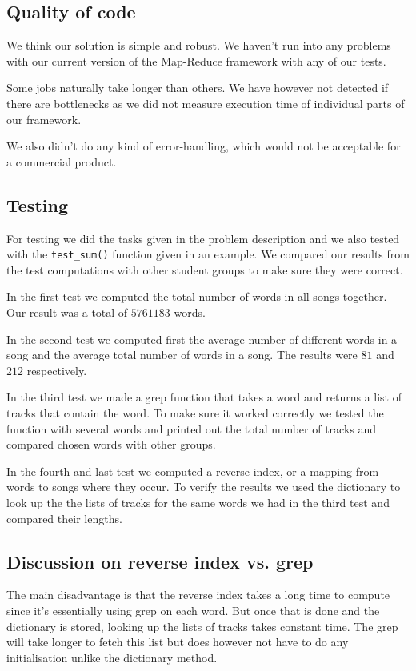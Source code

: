 \documentclass[a4paper,10pt]{article}
\begin{document}
\subsection{Quality of code}
We think our solution is simple and robust. We haven't run into any problems with our current version of the Map-Reduce framework with any of our tests. 

Some jobs naturally take longer than others. We have however not detected if there are bottlenecks as we did not measure execution time of individual parts of our framework.

We also didn't do any kind of error-handling, which would not be acceptable for a commercial product.

\subsection{Testing}

For testing we did the tasks given in the problem description and we also tested with the \verb=test_sum()= function given in an example. We compared our results from the test computations with other student groups to make sure they were correct.

In the first test we computed the total number of words in all songs together. Our result was a total of $5761183$ words.

In the second test we computed first the average number of different words in a song and the average total number of words in a song. The results were $81$ and $212$ respectively.

In the third test we made a grep function that takes a word and returns a list of tracks that contain the word. To make sure it worked correctly we tested the function with several words and printed out the total number of tracks and compared chosen words with other groups.

In the fourth and last test we computed a reverse index, or a mapping from words to songs where they occur. To verify the results we used the dictionary to look up the   the lists of tracks for the same words we had in the third test and compared their lengths.

\subsection{Discussion on reverse index vs. grep}

The main disadvantage is that the reverse index takes a long time to compute since it's essentially using grep on each word. But once that is done and the dictionary is stored, looking up the lists of tracks takes constant time. The grep will take longer to fetch this list but does however not have to do any initialisation unlike the dictionary method.
\end{document}
